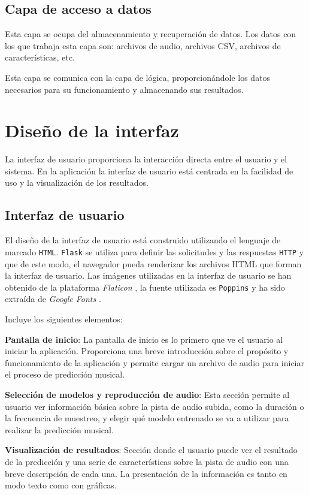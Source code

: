 \subsection{Capa de acceso a datos}

Esta capa se ocupa del almacenamiento y recuperación de datos. Los datos con los que trabaja esta capa son: archivos de audio, archivos CSV, archivos de características, etc.

Esta capa se comunica con la capa de lógica, proporcionándole los datos necesarios para su funcionamiento y almacenando sus resultados.


\section{Diseño de la interfaz}

La interfaz de usuario proporciona la interacción directa entre el usuario y el sistema. En la aplicación la interfaz de usuario está centrada en la facilidad de uso y la visualización de los resultados.

\subsection{Interfaz de usuario}

El diseño de la interfaz de usuario está construido utilizando el lenguaje de marcado \texttt{HTML}. \texttt{Flask} se utiliza para definir las solicitudes y las respuestas \texttt{HTTP} y que de este modo, el navegador pueda renderizar los archivos HTML que forman la interfaz de usuario. 
Las imágenes utilizadas en la interfaz de usuario se han obtenido de la plataforma \textit{Flaticon} \cite{Flaticon}, la fuente utilizada es \texttt{Poppins} y ha sido extraída de \textit{Google Fonts} \cite{Google_Fonts}.

Incluye los siguientes elementos:

\textbf{Pantalla de inicio}: La pantalla de inicio es lo primero que ve el usuario al iniciar la aplicación. Proporciona una breve introducción sobre el propósito y funcionamiento de la aplicación y permite cargar un archivo de audio para iniciar el proceso de predicción musical.


\textbf{Selección de modelos y reproducción de audio}: Esta sección permite al usuario ver información básica sobre la pista de audio subida, como la duración o la frecuencia de muestreo, y elegir qué modelo entrenado se va a utilizar para realizar la predicción musical.


\textbf{Visualización de resultados}: Sección donde el usuario puede ver el resultado de la predicción y una serie de características sobre la pista de audio con una breve descripción de cada una. La presentación de la información es tanto en modo texto como con gráficas.

